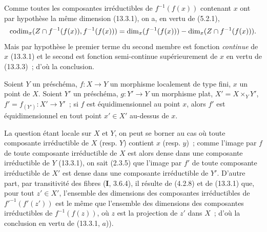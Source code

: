 Comme toutes les composantes irréductibles de $f^{-1}(f(x))$ contenant $x$
ont par hypothèse la même dimension (13.3.1), on a, en vertu de (5.2.1),
\[
  \operatorname{codim}_x(Z\cap f^{-1}(f(x)),f^{-1}(f(x)))
  =\dim_x(f^{-1}(f(x)))-\dim_x(Z\cap f^{-1}(f(x))).
\]
Mais par hypothèse le premier terme du second membre est fonction
\emph{continue} de $x$ (13.3.1) et le second est fonction semi-continue
supérieurement de $x$ en vertu de (13.3.3)~; d'où la conclusion.

\begin{proposition}[13.3.8]
\label{IV.13.3.8-fr}
Soient $Y$ un préschéma, $f:X\to Y$ un morphisme localement de type fini, $x$
un point de $X$. Soient $Y'$ un préschéma, $g:Y'\to Y$ un morphisme \textup{plat},
$X'=X\times_Y Y'$, $f'=f_{(Y')}:X'\to Y'$~; si $f$ est équidimensionnel au
point $x$, alors $f'$ est équidimensionnel en tout point $x'\in X'$ au-dessus
de $x$.
\end{proposition}

La question étant locale sur $X$ et $Y$, on peut se borner au cas où toute
composante irréductible de $X$ (resp. $Y$) contient $x$ (resp. $y$)~; comme
l'image par $f$ de toute composante irréductible de $X$ est alors dense dans
une composante irréductible de $Y$ (13.3.1), on sait (2.3.5) que l'image par
$f'$ de toute composante irréductible de $X'$ est dense dans une composante
irréductible de $Y'$. D'autre part, par transitivité des fibres
(\textbf{I}, 3.6.4), il résulte de (4.2.8) et de (13.3.1) que, pour tout
$z'\in X'$, l'ensemble des dimensions des composantes irréductibles de
${f'}^{-1}(f'(z'))$ est le même que l'ensemble des dimensions des composantes
irréductibles de $f^{-1}(f(z))$, où $z$ est la projection de $z'$ dans $X$~;
d'où la conclusion en vertu de (13.3.1, $a$)).

